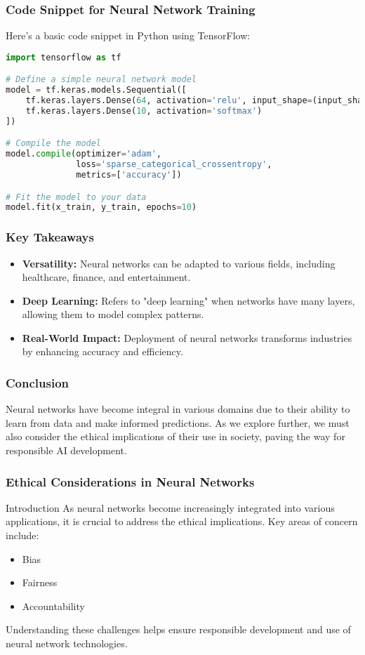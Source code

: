 \documentclass{beamer}
\begin{document}
\begin{frame}[fragile]
    \frametitle{Code Snippet for Neural Network Training}
    Here’s a basic code snippet in Python using TensorFlow:
    \begin{lstlisting}[language=Python]
import tensorflow as tf

# Define a simple neural network model
model = tf.keras.models.Sequential([
    tf.keras.layers.Dense(64, activation='relu', input_shape=(input_shape,)),
    tf.keras.layers.Dense(10, activation='softmax')
])

# Compile the model
model.compile(optimizer='adam',
              loss='sparse_categorical_crossentropy',
              metrics=['accuracy'])

# Fit the model to your data
model.fit(x_train, y_train, epochs=10)
    \end{lstlisting}
\end{frame}

\begin{frame}
    \frametitle{Key Takeaways}
    \begin{itemize}
        \item \textbf{Versatility:} Neural networks can be adapted to various fields, including healthcare, finance, and entertainment.
        \item \textbf{Deep Learning:} Refers to "deep learning" when networks have many layers, allowing them to model complex patterns.
        \item \textbf{Real-World Impact:} Deployment of neural networks transforms industries by enhancing accuracy and efficiency.
    \end{itemize}
\end{frame}

\begin{frame}
    \frametitle{Conclusion}
    Neural networks have become integral in various domains due to their ability to learn from data and make informed predictions. As we explore further, we must also consider the ethical implications of their use in society, paving the way for responsible AI development.
\end{frame}

\begin{frame}[fragile]
    \frametitle{Ethical Considerations in Neural Networks}
    \begin{block}{Introduction}
        As neural networks become increasingly integrated into various applications, it is crucial to address the ethical implications. Key areas of concern include:
        \begin{itemize}
            \item Bias
            \item Fairness
            \item Accountability
        \end{itemize}
        Understanding these challenges helps ensure responsible development and use of neural network technologies.
    \end{block}
\end{frame}
\end{document}

